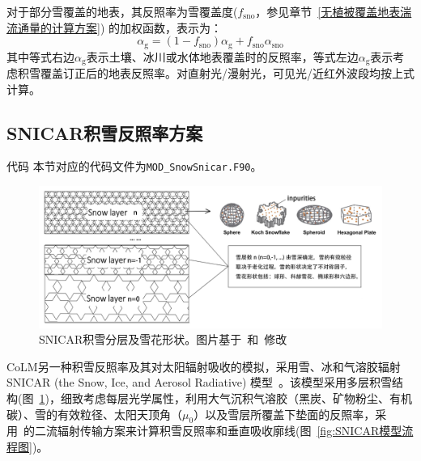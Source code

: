 对于部分雪覆盖的地表，其反照率为雪覆盖度($f_{\mathrm{sno}}$，参见章节~\ref{无植被覆盖地表湍流通量的计算方案}) 的加权函数，表示为：
\begin{equation}
  \alpha_{\mathrm{g}}=\left(1-f_{\mathrm{sno}}\right) \alpha_{\mathrm{g}} + f_{\mathrm{sno}} \alpha_{\mathrm{sno}}
\end{equation}
其中等式右边$\alpha_{\mathrm{g}}$表示土壤、冰川或水体地表覆盖时的反照率，等式左边$\alpha_{\mathrm{g}}$表示考虑积雪覆盖订正后的地表反照率。对直射光/漫射光，可见光/近红外波段均按上式计算。

\subsection{SNICAR积雪反照率方案}\label{SNICAR积雪反照率}
\begin{mymdframed}{代码}
  本节对应的代码文件为\texttt{MOD\_SnowSnicar.F90}。
\end{mymdframed}

{
  \begin{figure}[htbp]
    \centering
    \includegraphics[width=0.9\columnwidth]{Figures/辐射过程及辐射通量计算/SNICAR积雪分层及雪花形状.jpg}
    \caption[SNICAR积雪分层及雪花形状]{SNICAR积雪分层及雪花形状。图片基于~\citet{he2017ImpactSnowGrain}和~\citet{whicker2022SNICARADv4PhysicallyBased}修改}
    \label{fig:SNICAR积雪分层及雪花形状}
  \end{figure}
}

CoLM另一种积雪反照率及其对太阳辐射吸收的模拟，采用雪、冰和气溶胶辐射SNICAR (the Snow, Ice, and Aerosol Radiative) 模型~\citep{flanner2021SNICARADv3CommunityTool}。该模型采用多层积雪结构(图~\ref{fig:SNICAR积雪分层及雪花形状})，细致考虑每层光学属性，利用大气沉积气溶胶（黑炭、矿物粉尘、有机碳）、雪的有效粒径、太阳天顶角（$\mu_{0}$）以及雪层所覆盖下垫面的反照率，采用~\citet{toon1989RapidCalculationRadiative}的二流辐射传输方案来计算积雪反照率和垂直吸收廓线(图~\ref{fig:SNICAR模型流程图})。

